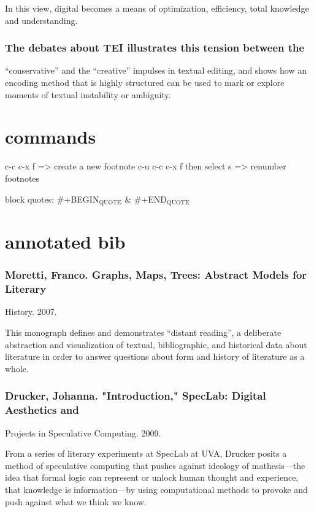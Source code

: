 \documentclass[11pt]{article}
\begin{document}
In this view, digital becomes a means of optimization, efficiency,
total knowledge and understanding.

\subsubsection{The debates about TEI illustrates this tension between the}
\label{sec:orge15036d}
“conservative” and the “creative” impulses in textual editing, and
shows how an encoding method that is highly structured can be used to
mark or explore moments of textual instability or ambiguity.

\section{commands}
\label{sec:org4eeddc3}
c-c c-x f => create a new footnote
c-u c-c c-x f then select s => renumber footnotes

block quotes: \#+BEGIN\(_{\text{QUOTE}}\) \& \#+END\(_{\text{QUOTE}}\)

\section{annotated bib}
\label{sec:org02a663e}
\subsubsection{Moretti, Franco. Graphs, Maps, Trees: Abstract Models for Literary}
\label{sec:org420b810}
History. 2007.

This monograph defines and demonstrates “distant reading”, a deliberate abstraction and visualization of textual, bibliographic, and historical data about literature in order to answer questions about form and history of literature as a whole. 

\subsubsection{Drucker, Johanna. "Introduction," SpecLab: Digital Aesthetics and}
\label{sec:org98757a9}
Projects in Speculative Computing. 2009.

From a series of literary experiments at SpecLab at UVA, Drucker
posits a method of speculative computing that pushes against ideology
of mathesis---the idea that formal logic can represent or unlock human
thought and experience, that knowledge is information---by using
computational methods to provoke and push against what we think we
know.
\end{document}
